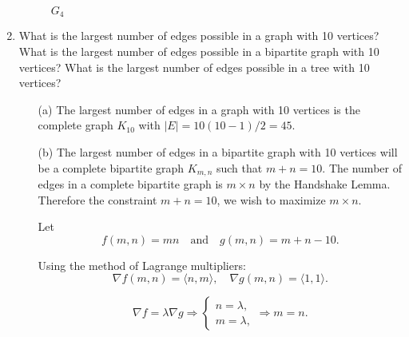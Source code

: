\documentclass[11pt, letterpaper, includehead]{article}
\theoremstyle{plain}
\theoremstyle{mydefinition}
\theoremstyle{myproperty}
\begin{document}
\begin{enumerate}[label=\textbf{\arabic*}., leftmargin=*]
\begin{multicols}{4}
\begin{figure}[H]
                  \caption{$G_4$}
                  \label{fig:3.G4}
              \end{figure}

          \end{multicols}

    \item What is the largest number of edges possible in a graph with 10
          vertices?
          What is the largest number of edges possible in a bipartite graph 
          with 10
          vertices? What is the largest number of edges possible in a tree with
          10
          vertices?

          \begin{enumerate}
            \item[(a)] The largest number of edges in a graph with 10 vertices is the complete graph $K_{10}$ with $|E| = 10(10-1)/2 = 45$.
            \item[(b)] The largest number of edges in a bipartite graph with 10 vertices will be a complete bipartite graph $K_{m, n}$ such that $m + n = 10$. The number of edges in a complete bipartite graph is $m \times n$ by the Handshake Lemma. Therefore the constraint $m + n = 10$, we wish to maximize $m \times n$.
            
            Let 
        \[
        f(m, n) = mn \quad \text{and} \quad g(m, n) = m + n - 10.
        \]

        Using the method of Lagrange multipliers:
        \[
        \nabla f(m, n) = \langle n, m \rangle, \quad \nabla g(m, n) = \langle 1, 1 \rangle.
        \]

        \[
        \nabla f = \lambda \nabla g \Rightarrow 
        \begin{cases}
        n = \lambda, \\
        m = \lambda,
        \end{cases}
        \Rightarrow m = n.
        \]


\end{enumerate}
\end{enumerate}
\end{document}
